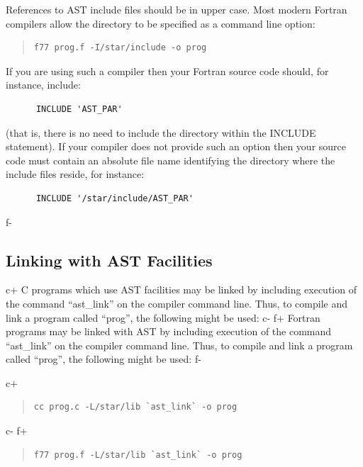 \documentclass[twoside,11pt]{article}
\begin{document}
References to AST include files should be in upper case. Most modern
Fortran compilers allow the directory to be specified as a command line
option:

\begin{quote}
\small
\begin{verbatim}
f77 prog.f -I/star/include -o prog
\end{verbatim}
\normalsize
\end{quote}

If you are using such a compiler then your Fortran source code should,
for instance, include:

\small
\begin{verbatim}
      INCLUDE 'AST_PAR'
\end{verbatim}
\normalsize

(that is, there is no need to include the directory within the INCLUDE
statement). If your compiler does not provide such an option then your
source code must contain an absolute file name identifying the directory
where the include files reside, for instance:

\small
\begin{verbatim}
      INCLUDE '/star/include/AST_PAR'
\end{verbatim}
\normalsize

f-

\subsection{\label{ss:linking}Linking with AST Facilities}

c+
C programs which use AST facilities may be linked by including
execution of the command ``ast\_link'' on the compiler command
line. Thus, to compile and link a program called ``prog'', the
following might be used:
c-
f+
Fortran programs may be linked with AST by including execution of the
command ``ast\_link'' on the compiler command line. Thus, to compile
and link a program called ``prog'', the following might be used:
f-

c+
\begin{quote}
\small
\begin{verbatim}
cc prog.c -L/star/lib `ast_link` -o prog
\end{verbatim}
\normalsize
\end{quote}
c-
f+
\begin{quote}
\small
\begin{verbatim}
f77 prog.f -L/star/lib `ast_link` -o prog
\end{verbatim}
\normalsize
\end{quote}
\end{document}
